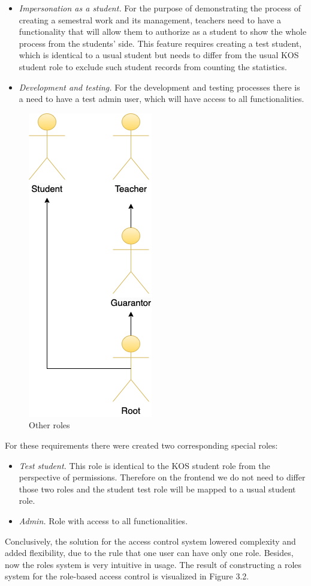 \begin{itemize}
    \item \emph{Impersonation as a student.} For the purpose of demonstrating the process of creating a semestral work and its management, teachers need to have a functionality that will allow them to authorize as a student to show the whole process from the students' side. This feature requires creating a test student, which is identical to a usual student but needs  to differ from the usual KOS student role to exclude such student records from counting the statistics. 
    \item \emph{Development and testing.} For the development and testing processes there is a need to have a test admin user, which will have access to all functionalities. 
\end{itemize}

\begin{figure}[h]
\centering
\includegraphics[scale=0.54]{../png/roles.png}
\caption{Other roles}\label{picture:special_roles}
\end{figure}


\noindent For these requirements there were created two corresponding special roles:

\begin{itemize}
    \item \emph{Test student.} This role is identical to the KOS student role from the perspective of permissions. Therefore on the frontend we do not need to differ those two roles and the student test role will be mapped to a usual student role.
    \item \emph{Admin.} Role with access to all functionalities.
\end{itemize}

\noindent Conclusively, the solution for the access control system lowered complexity and added flexibility, due to the rule that one user can have only one role. Besides, now the roles system is very intuitive in usage. The result of constructing a roles system for the role-based access control is visualized in Figure 3.2.
